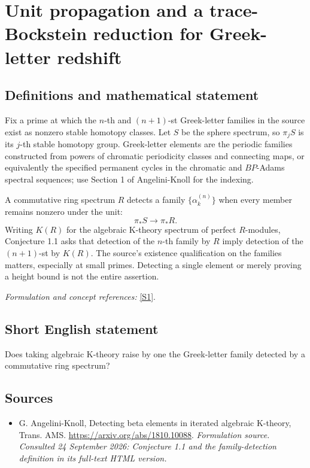 \documentclass[11pt]{article}
\begin{document}
\section*{\texorpdfstring{Unit propagation and a trace-Bockstein reduction for Greek-letter redshift}{Unit propagation and a trace-Bockstein reduction for Greek-letter redshift}}\label{20000025}
\subsection{Definitions and mathematical statement}
Fix a prime at which the $n$-th and $(n+1)$-st Greek-letter families in the source exist as nonzero stable homotopy classes. Let $S$ be the sphere spectrum, so $\pi_jS$ is its $j$-th stable homotopy group. Greek-letter elements are the periodic families constructed from powers of chromatic periodicity classes and connecting maps, or equivalently the specified permanent cycles in the chromatic and $BP$-Adams spectral sequences; use Section 1 of Angelini-Knoll for the indexing.

A commutative ring spectrum $R$ detects a family $\{\alpha_k^{(n)}\}$ when every member remains nonzero under the unit:
\[
 \pi_*S\longrightarrow\pi_*R.
\]
Writing $K(R)$ for the algebraic K-theory spectrum of perfect $R$-modules, Conjecture 1.1 asks that detection of the $n$-th family by $R$ imply detection of the $(n+1)$-st by $K(R)$. The source's existence qualification on the families matters, especially at small primes. Detecting a single element or merely proving a height bound is not the entire assertion.
\par\smallskip\textit{Formulation and concept references:} \href{https://arxiv.org/abs/1810.10088}{[S1]}.

\subsection{Short English statement}
Does taking algebraic K-theory raise by one the Greek-letter family detected by a commutative ring spectrum?
\subsection{Sources}
\begin{itemize}
\item[S1]G. Angelini-Knoll, Detecting beta elements in iterated algebraic K-theory, Trans. AMS.
\url{https://arxiv.org/abs/1810.10088}.
\textit{Formulation source. Consulted 24 September 2026: Conjecture 1.1 and the family-detection definition in its full-text HTML version.}
\end{itemize}
\end{document}
